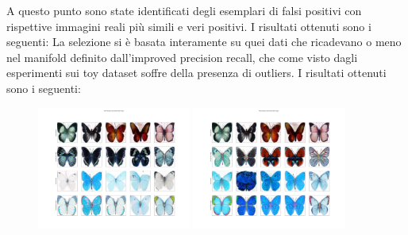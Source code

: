 A questo punto sono state identificati degli esemplari di falsi positivi con rispettive immagini reali più simili e veri positivi. I risultati ottenuti sono i seguenti:
La selezione si è basata interamente su quei dati che ricadevano o meno nel manifold definito dall'improved precision recall, che come visto dagli esperimenti sui toy dataset soffre della presenza di outliers.
I risultati ottenuti sono i seguenti:

\begin{figure}[!ht]
    \centering
    \includegraphics[width=0.45\textwidth]{../images/realworldexperiments/butterflies/examples/fp_grayscale_histogram.png}
    \includegraphics[width=0.45\textwidth]{../images/realworldexperiments/butterflies/examples/fp_hsv_histogram.png}
\end{figure}
